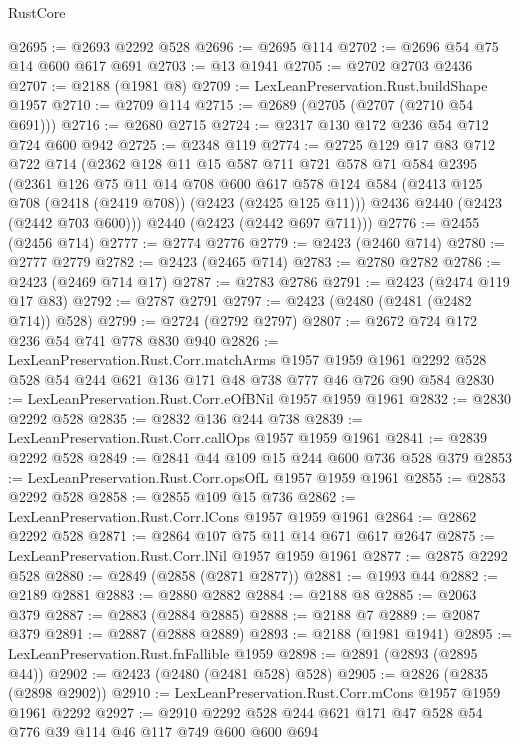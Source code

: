 \begin{lexlean}{RustCore}
\begin{coremodule}
@2695 := @2693 @2292 @528
@2696 := @2695 @114
@2702 := @2696 @54 @75 @14 @600 @617 @691
@2703 := @13 @1941
@2705 := @2702 @2703 @2436
@2707 := @2188 (@1981 @8)
@2709 := LexLeanPreservation.Rust.buildShape @1957
@2710 := @2709 @114
@2715 := @2689 (@2705 (@2707 (@2710 @54 @691)))
@2716 := @2680 @2715
@2724 := @2317 @130 @172 @236 @54 @712 @724 @600 @942
@2725 := @2348 @119
@2774 := @2725
    @129
    @17
    @83
    @712
    @722
    @714
    (@2362
      @128
      @11
      @15
      @587
      @711
      @721
      @578
      @71
      @584
      @2395
      (@2361
        @126
        @75
        @11
        @14
        @708
        @600
        @617
        @578
        @124
        @584
        (@2413 @125 @708 (@2418 (@2419 @708)) (@2423 (@2425 @125 @11)))
        @2436
        @2440
        (@2423 (@2442 @703 @600)))
      @2440
      (@2423 (@2442 @697 @711)))
@2776 := @2455 (@2456 @714)
@2777 := @2774 @2776
@2779 := @2423 (@2460 @714)
@2780 := @2777 @2779
@2782 := @2423 (@2465 @714)
@2783 := @2780 @2782
@2786 := @2423 (@2469 @714 @17)
@2787 := @2783 @2786
@2791 := @2423 (@2474 @119 @17 @83)
@2792 := @2787 @2791
@2797 := @2423 (@2480 (@2481 (@2482 @714)) @528)
@2799 := @2724 (@2792 @2797)
@2807 := @2672 @724 @172 @236 @54 @741 @778 @830 @940
@2826 := LexLeanPreservation.Rust.Corr.matchArms
    @1957
    @1959
    @1961
    @2292
    @528
    @528
    @54
    @244
    @621
    @136
    @171
    @48
    @738
    @777
    @46
    @726
    @90
    @584
@2830 := LexLeanPreservation.Rust.Corr.eOfBNil @1957 @1959 @1961
@2832 := @2830 @2292 @528
@2835 := @2832 @136 @244 @738
@2839 := LexLeanPreservation.Rust.Corr.callOps @1957 @1959 @1961
@2841 := @2839 @2292 @528
@2849 := @2841 @44 @109 @15 @244 @600 @736 @528 @379
@2853 := LexLeanPreservation.Rust.Corr.opsOfL @1957 @1959 @1961
@2855 := @2853 @2292 @528
@2858 := @2855 @109 @15 @736
@2862 := LexLeanPreservation.Rust.Corr.lCons @1957 @1959 @1961
@2864 := @2862 @2292 @528
@2871 := @2864 @107 @75 @11 @14 @671 @617 @2647
@2875 := LexLeanPreservation.Rust.Corr.lNil @1957 @1959 @1961
@2877 := @2875 @2292 @528
@2880 := @2849 (@2858 (@2871 @2877))
@2881 := @1993 @44
@2882 := @2189 @2881
@2883 := @2880 @2882
@2884 := @2188 @8
@2885 := @2063 @379
@2887 := @2883 (@2884 @2885)
@2888 := @2188 @7
@2889 := @2087 @379
@2891 := @2887 (@2888 @2889)
@2893 := @2188 (@1981 @1941)
@2895 := LexLeanPreservation.Rust.fnFallible @1959
@2898 := @2891 (@2893 (@2895 @44))
@2902 := @2423 (@2480 (@2481 @528) @528)
@2905 := @2826 (@2835 (@2898 @2902))
@2910 := LexLeanPreservation.Rust.Corr.mCons @1957 @1959 @1961 @2292
@2927 := @2910 @2292 @528 @244 @621 @171 @47 @528 @54 @776 @39 @114 @46 @117 @749 @600 @600 @694

\end{coremodule}
\end{lexlean}
